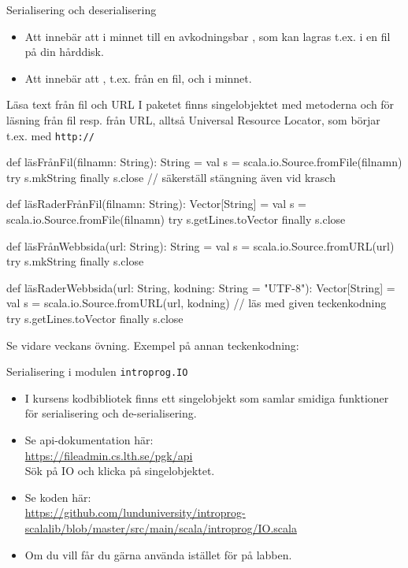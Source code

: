 


\begin{Slide}{Serialisering och deserialisering}
\begin{itemize}
  \item Att  innebär att  i minnet till en avkodningsbar , som kan lagras t.ex. i en fil på din hårddisk.
  \item Att  innebär att , t.ex. från en fil, och  i minnet.
\end{itemize}
\end{Slide}


\begin{Slide}{Läsa text från fil och URL}\SlideFontSmall
I paketet  finns singelobjektet  med metoderna  och  för läsning från fil resp. från  URL, alltså Universal Resource Locator, som börjar t.ex. med \texttt{http://}
\begin{Code}
def läsFrånFil(filnamn: String): String = 
  val s = scala.io.Source.fromFile(filnamn)
  try s.mkString finally s.close // säkerställ stängning även vid krasch

def läsRaderFrånFil(filnamn: String): Vector[String] =
  val s = scala.io.Source.fromFile(filnamn)
  try s.getLines.toVector finally s.close 

def läsFrånWebbsida(url: String): String = 
  val s = scala.io.Source.fromURL(url)
  try s.mkString finally s.close

def läsRaderWebbsida(url: String, kodning: String = "UTF-8"): Vector[String] =
  val s = scala.io.Source.fromURL(url, kodning) // läs med given teckenkodning
  try s.getLines.toVector finally s.close 

\end{Code}
{\SlideFontTiny Se vidare veckans övning. Exempel på annan teckenkodning:  }
\end{Slide}


\begin{Slide}{Serialisering i modulen \texttt{introprog.IO}}
\begin{itemize}
\item I kursens kodbibliotek  finns ett singelobjekt  som samlar smidiga funktioner för serialisering och de-serialisering. 
\item Se api-dokumentation här: \\ \url{https://fileadmin.cs.lth.se/pgk/api} \\ Sök på IO och klicka på singelobjektet.
\item Se koden här:\\
\url{https://github.com/lunduniversity/introprog-scalalib/blob/master/src/main/scala/introprog/IO.scala}
\item Om du vill får du gärna använda  istället för  på labben.  
\end{itemize}
\end{Slide}
